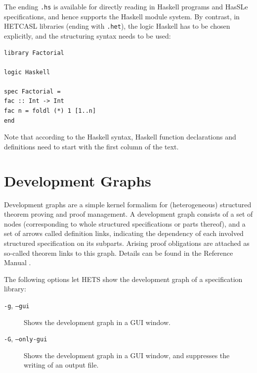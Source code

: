 \documentclass{article}
\newcommand{\normalTEXTSC}[2]{{#1\scriptsize#2}}
\newcommand     {\Hets}{\normalTEXTSC{H}{ETS}\xspace}
\newcommand{\HetCASL}{\normalTEXTSC{H}{ET}\normalTEXTSC{C}{ASL}\xspace}
\begin{document}
The ending \texttt{.hs} is available for directly reading in
Haskell programs and HasSLe specifications, 
and hence supports the Haskell module system.
By contrast, in \HetCASL libraries (ending with \texttt{.het}),
the logic Haskell has to be chosen explicitly, and the \CASL structuring
syntax needs to be used:

\begin{verbatim}
library Factorial

logic Haskell

spec Factorial =
fac :: Int -> Int
fac n = foldl (*) 1 [1..n]
end
\end{verbatim}

Note that according to the Haskell syntax, Haskell function
declarations and definitions need to start with the first column of
the text.




\section{Development Graphs}\label{sec:DevGraph}

Development graphs are a simple kernel formalism for (heterogeneous)
structured theorem proving and proof management.  A development graph
consists of a set of nodes (corresponding to whole structured
specifications or parts thereof), and a set of arrows called
definition links, indicating the dependency of each involved
structured specification on its subparts.  Arising proof obligations
are attached as so-called theorem links to this graph.
Details can be found in the \CASL Reference Manual \cite[IV:4]{CASL/RefManual}.

The following options let \Hets show the development graph of
a specification library:
\begin{description}
\item[\texttt{-g}, \texttt{--gui}]  Shows the development graph in a GUI window.
\item[\texttt{-G}, \texttt{--only-gui}] Shows the development graph in a GUI window,
and suppresses the writing of an output file.
\end{description}
\end{document}

